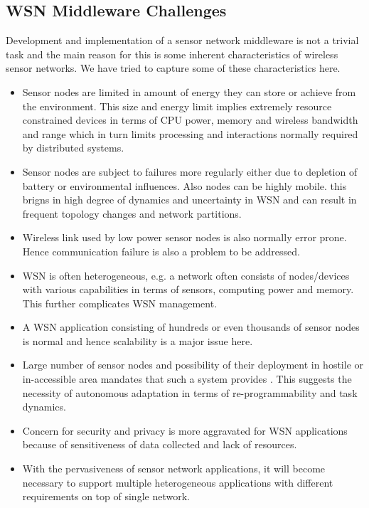 \subsection{WSN Middleware Challenges}
Development and implementation of a sensor
network middleware is not a trivial
task and the main reason for this is some inherent
characteristics of wireless sensor networks. We
have tried to capture some of these
characteristics here.
\begin{itemize}
	\item Sensor nodes are limited in amount of
	energy they can store or achieve from the
	environment. This size and energy limit implies
	extremely resource constrained devices in terms
	of CPU power, memory and wireless bandwidth and
	range which in turn limits processing and
	interactions normally required by distributed
	systems.
	\item Sensor nodes are subject to failures more
	regularly either due to depletion of battery or
	environmental influences. Also nodes can be
	highly mobile. this brigns in high degree of
	dynamics and uncertainty in WSN and can result
	in frequent topology changes and network
	partitions.
	\item Wireless link used by low power sensor
	nodes is also normally error prone. Hence
	communication failure is also a problem to be
	addressed. 
	\item WSN is often heterogeneous, e.g. a network
	often consists of nodes/devices with various
	capabilities in terms of sensors, computing
	power and memory. This further complicates
	WSN management.
	\item A WSN application consisting of hundreds
	or even thousands of sensor nodes is normal and
	hence scalability is a major issue here.
	\item Large number of sensor nodes and
	possibility of their deployment in hostile or
	in-accessible area mandates that such a system
	provides  \cite{Estrin99}. This suggests the
	necessity of autonomous adaptation in terms of re-programmability and task dynamics.
	\item Concern for security and privacy is more
	aggravated for WSN applications because of
	sensitiveness of data collected and lack of
	resources. 
	\item With the pervasiveness of sensor network
	applications, it will become necessary to
	support multiple heterogeneous applications with
	different requirements on top of single network.
\end{itemize}

